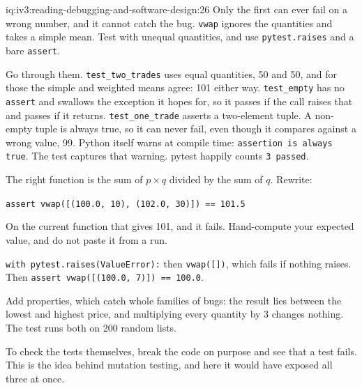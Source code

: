 \begin{solution}{iq:iv3:reading-debugging-and-software-design:26}
Only the first can ever fail on a wrong number, and it cannot catch the bug. \texttt{vwap} ignores the quantities and takes a simple mean. Test with unequal quantities, and use \texttt{pytest.raises} and a bare \texttt{assert}.

Go through them. \texttt{test\_two\_trades} uses equal quantities, 50 and 50, and for those the simple and weighted means agree: 101 either way. \texttt{test\_empty} has no \texttt{assert} and swallows the exception it hopes for, so it passes if the call raises that and passes if it returns. \texttt{test\_one\_trade} asserts a two-element tuple. A non-empty tuple is always true, so it can never fail, even though it compares against a wrong value, 99. Python itself warns at compile time: \texttt{assertion is always true}. The test captures that warning. pytest happily counts \texttt{3 passed}.

The right function is the sum of $p \times q$ divided by the sum of $q$. Rewrite:

\texttt{assert vwap([(100.0, 10), (102.0, 30)]) == 101.5}

On the current function that gives 101, and it fails. Hand-compute your expected value, and do not paste it from a run.

\texttt{with pytest.raises(ValueError):} then \texttt{vwap([])}, which fails if nothing raises. Then \texttt{assert vwap([(100.0, 7)]) == 100.0}.

Add properties, which catch whole families of bugs: the result lies between the lowest and highest price, and multiplying every quantity by 3 changes nothing. The test runs both on 200 random lists.

To check the tests themselves, break the code on purpose and see that a test fails. This is the idea behind mutation testing, and here it would have exposed all three at once.


\end{solution}

